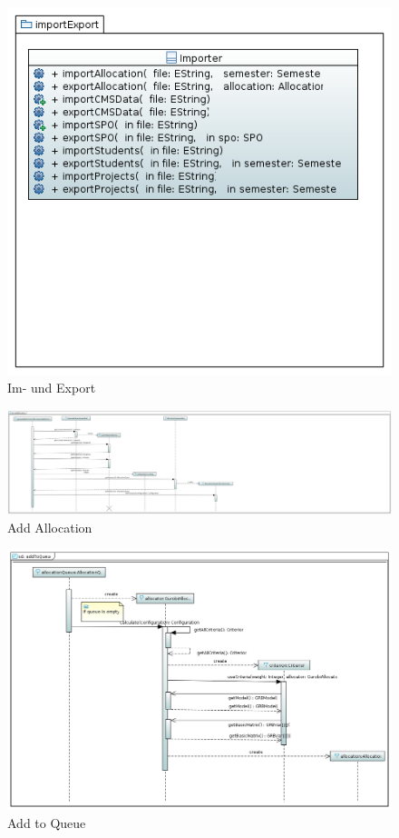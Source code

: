 \documentclass[parskip=full]{scrartcl}
\begin{document}
\begin{figure}[!htb]
\centering
\includegraphics[width=\linewidth]{bilder/importExport.png}
\caption{Im- und Export}
\label{uml:imExport}
\end{figure}




\begin{figure}
\centering
\includegraphics[width=\linewidth]{bilder/seqAddAllocation.png}
\caption{Add Allocation}
\label{seq:addAlloction}
\end{figure}

\begin{figure}
\centering
\includegraphics[width=\linewidth]{bilder/seqaddToQueue.png}
\caption{Add to Queue}
\label{seq:addToQueue}
\end{figure}
\end{document}
